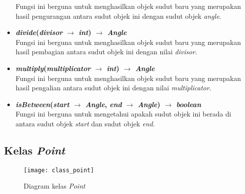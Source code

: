 \begin{itemize}
	Fungsi ini berguna untuk menghasilkan objek sudut baru yang merupakan hasil pengurangan antara sudut objek ini dengan sudut objek \textit{angle}.
	\item \textbf{\textit{divide}(\textit{divisor} \(\rightarrow\) \textit{int}) \(\rightarrow\) \textit{Angle}}\\
	Fungsi ini berguna untuk menghasilkan objek sudut baru yang merupakan hasil pembagian antara sudut objek ini dengan nilai \textit{divisor}.
	\item \textbf{\textit{multiply}(\textit{multiplicator} \(\rightarrow\) \textit{int}) \(\rightarrow\) \textit{Angle}}\\
	Fungsi ini berguna untuk menghasilkan objek sudut baru yang merupakan hasil pengalian antara sudut objek ini dengan nilai \textit{multiplicator}.
	\item \textbf{\textit{isBetween}(\textit{start} \(\rightarrow\) \textit{Angle}, \textit{end} \(\rightarrow\) \textit{Angle}) \(\rightarrow\) \textit{boolean}}\\
	Fungsi ini berguna untuk mengetahui apakah sudut objek ini berada di antara sudut objek \textit{start} dan sudut objek \textit{end}.
\end{itemize}

\subsection{Kelas \textit{Point}}
\begin{figure}[H]
	\centering  
	\texttt{[image: class\_point]}
	\caption[Diagram kelas \textit{Point}]{Diagram kelas \textit{Point}}
	\label{fig:class_point}
\end{figure}

